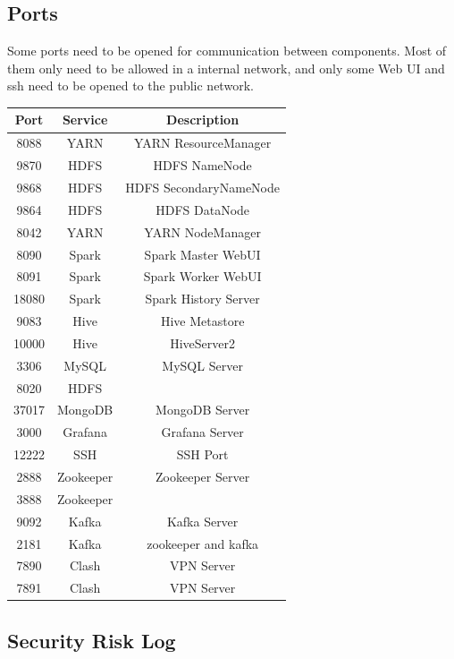 \subsection{Ports}
Some ports need to be opened for communication between components. Most of them only need to be allowed in a internal network, and only some Web UI and ssh need to be opened to the public network.


\begin{table}[H]
    \centering
    \begin{tabular}{ccc}
        \hline
        Port & Service & Description \\ \hline
        8088 & YARN & YARN ResourceManager \\
        9870 & HDFS & HDFS NameNode \\
        9868 & HDFS & HDFS SecondaryNameNode \\
        9864 & HDFS & HDFS DataNode \\
        8042 & YARN & YARN NodeManager \\
        8090 & Spark & Spark Master WebUI \\
        8091 & Spark & Spark Worker WebUI \\
        18080 & Spark & Spark History Server \\
        9083 & Hive & Hive Metastore \\
        10000 & Hive & HiveServer2 \\
        3306 & MySQL & MySQL Server \\
        8020 & HDFS & \\
        37017 & MongoDB & MongoDB Server \\
        3000 & Grafana & Grafana Server \\
        12222 & SSH & SSH Port \\
        2888 & Zookeeper & Zookeeper Server \\
        3888 & Zookeeper & \\
        9092 & Kafka & Kafka Server \\
        2181 & Kafka & zookeeper and kafka \\
        7890 & Clash & VPN Server \\
        7891 & Clash & VPN Server \\
    \hline
    \end{tabular}
\end{table}



\subsection{Security Risk Log}
\label{a-sec}

